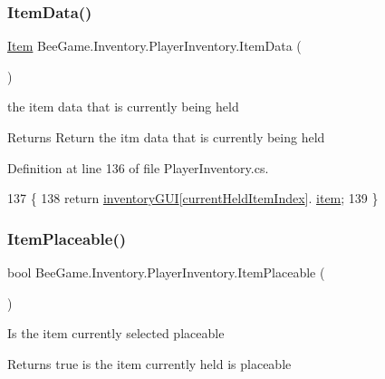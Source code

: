\subsubsection{\texorpdfstring{Item\+Data()}{ItemData()}}
{\footnotesize\ttfamily \hyperlink{struct_bee_game_1_1_items_1_1_item}{Item} Bee\+Game.\+Inventory.\+Player\+Inventory.\+Item\+Data (\begin{DoxyParamCaption}{ }\end{DoxyParamCaption})}



the item data that is currently being held 

\begin{DoxyReturn}{Returns}
Return the itm data that is currently being held
\end{DoxyReturn}


Definition at line 136 of file Player\+Inventory.\+cs.


\begin{DoxyCode}
137         \{
138             \textcolor{keywordflow}{return} \hyperlink{class_bee_game_1_1_inventory_1_1_inventory_base_a48dcba7ad7bfa1bed8c9ae290fb32857}{inventoryGUI}[\hyperlink{class_bee_game_1_1_inventory_1_1_player_inventory_ac2978979c5c8e45fccc7d3a10882ea1b}{currentHeldItemIndex}].
      \hyperlink{class_bee_game_1_1_inventory_1_1_inventory_slot_a31b201e7eef9ed0001a447b3f76a7a81}{item};
139         \}
\end{DoxyCode}
\mbox{\label{class_bee_game_1_1_inventory_1_1_player_inventory_a5745fc23291d5916c116500b384bc66e}} 
\subsubsection{\texorpdfstring{Item\+Placeable()}{ItemPlaceable()}}
{\footnotesize\ttfamily bool Bee\+Game.\+Inventory.\+Player\+Inventory.\+Item\+Placeable (\begin{DoxyParamCaption}{ }\end{DoxyParamCaption})}



Is the item currently selected placeable 

\begin{DoxyReturn}{Returns}
true is the item currently held is placeable
\end{DoxyReturn}


